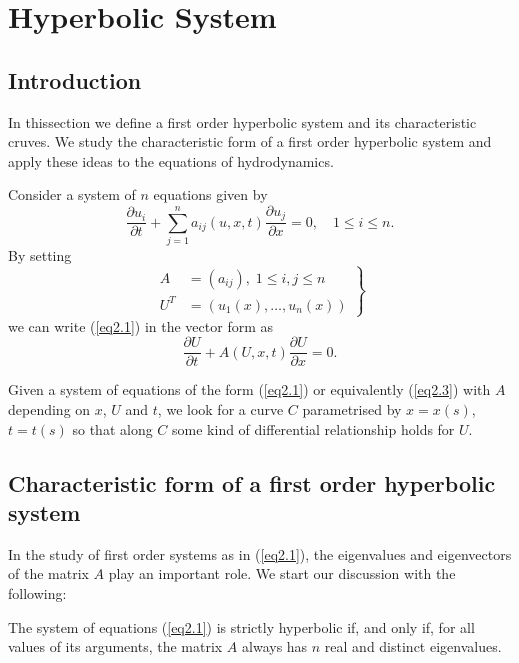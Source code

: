 
\chapter{Hyperbolic System}\label{chap2}


\section{Introduction}\label{chap2:sec2.1}
In this\pageoriginale section we define a first order hyperbolic
system and its characteristic cruves. We study the characteristic form
of a first order hyperbolic system and apply these ideas to the
equations of hydrodynamics.

Consider a system of $n$ equations given by 
\begin{equation*}
\frac{\partial u_i}{\partial t} + \sum\limits^n_{j=1} a_{ij} (u,x,t)
\frac{\partial u_j}{\partial x} = 0, \quad 1 \leq i \leq n. 
\tag{2.1}\label{eq2.1}
\end{equation*}
By setting
\begin{equation*}
\left.
\begin{aligned}
A & = (a_{ij}), \; 1 \leq i, j\leq n\\
U^T & = (u_1 (x), \ldots, u_n(x))
\end{aligned}
\right\} \tag{2.2}\label{eq2.2}
\end{equation*}
we can write (\ref{eq2.1}) in the vector form as
\begin{equation*}
\frac{\partial U}{\partial t} + A(U, x,t) \frac{\partial U}{\partial
  x} = 0.\tag{2.3}\label{eq2.3}
\end{equation*}

Given a system of equations of the form (\ref{eq2.1}) or equivalently (\ref{eq2.3})
with $A$ depending on $x$, $U$ and $t$, we look for a curve $C$
parametrised by $x = x(s)$, $t=t(s)$ so that along $C$ some kind of
differential relationship holds for $U$. 

\section{Characteristic form of a first order hyperbolic
  system}\label{chap2:sec2.2}

In the study of first order systems as in (\ref{eq2.1}), the eigenvalues and
eigenvectors of the matrix $A$ play an important role. We start our
discussion with the following:

\setcounter{Definition}{0}
\begin{Definition}\label{chap2:def2.1}
The system of equations (\ref{eq2.1}) is strictly hyperbolic if, and only if,
for all values of its arguments, the matrix $A$ always has $n$ real
and distinct eigenvalues.
\end{Definition}

